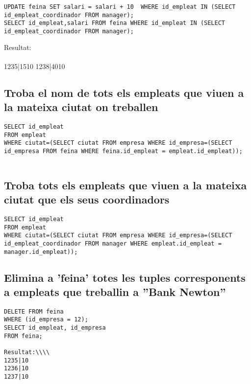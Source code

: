\documentclass[11p]{article}
\begin{document}
\begin{lstlisting}
UPDATE feina SET salari = salari + 10  WHERE id_empleat IN (SELECT id_empleat_coordinador FROM manager);
SELECT id_empleat,salari FROM feina WHERE id_empleat IN (SELECT id_empleat_coordinador FROM manager);
\end{lstlisting}

Resultat:\\\\

1235|1510
1238|4010

\subsection{Troba el nom de tots els empleats que viuen a la mateixa ciutat on treballen}

\begin{lstlisting}
SELECT id_empleat
FROM empleat
WHERE ciutat=(SELECT ciutat FROM empresa WHERE id_empresa=(SELECT id_empresa FROM feina WHERE feina.id_empleat = empleat.id_empleat));


\end{lstlisting}

\subsection{Troba tots els empleats que viuen a la mateixa ciutat que els seus coordinadors}

\begin{lstlisting}
SELECT id_empleat
FROM empleat
WHERE ciutat=(SELECT ciutat FROM empresa WHERE id_empresa=(SELECT id_empleat_coordinador FROM manager WHERE empleat.id_empleat = manager.id_empleat));

\end{lstlisting}

\subsection{Elimina a ’feina’ totes les tuples corresponents a empleats que treballin a ”Bank Newton”}

\begin{lstlisting}
DELETE FROM feina 
WHERE (id_empresa = 12);
SELECT id_empleat, id_empresa
FROM feina;

Resultat:\\\\
1235|10
1236|10
1237|10

\end{lstlisting}
\end{document}
